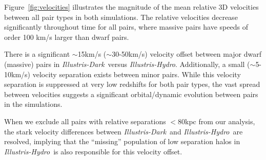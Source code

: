 \documentclass[twocolumn]{aastex63}
\newcommand\ID{\textit{Illustris-Dark}}
\newcommand\IH{\textit{Illustris-Hydro}}
\newcommand{\kc}[1]{\textcolor{mypink}{\textbf{#1}} }
\begin{document}

Figure~\ref{fig:velocities} illustrates the magnitude of the mean relative 3D velocities between all pair types in both simulations. The relative velocities decrease significantly throughout time for all pairs, where massive pairs have speeds of order 100 km/s larger than dwarf pairs. 

There is a significant $\sim$15km/s ($\sim$30-50km/s) velocity offset between major dwarf (massive) pairs in \ID\ versus \IH. Additionally, a small ($\sim$5-10km/s) velocity separation exists between minor pairs. While this velocity separation is suppressed at very low redshifts for both pair types, the vast spread between velocities suggests a significant orbital/dynamic evolution between pairs in the simulations. 

When we exclude all pairs with relative separations $<80$kpc from our analysis, the stark velocity differences between \ID\ and \IH\ are resolved, implying that the ``missing'' population of low separation halos in \IH\ is also responsible for this velocity offset. 
\end{document}
